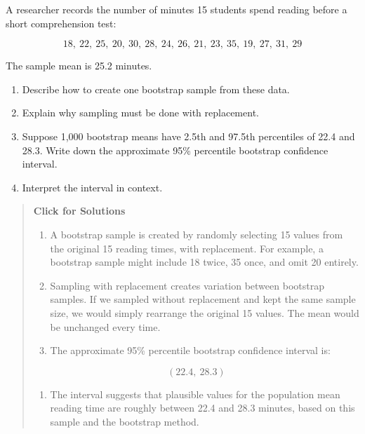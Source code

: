 \documentclass[
  letterpaper,
  DIV=11,
  numbers=noendperiod]{scrreprt}
\providecommand{\tightlist}{%
  \setlength{\itemsep}{0pt}\setlength{\parskip}{0pt}}
\begin{document}
\begin{tcolorbox}[enhanced jigsaw, arc=.35mm, bottomrule=.15mm, bottomtitle=1mm, breakable, colback=white, colbacktitle=quarto-callout-note-color!10!white, colframe=quarto-callout-note-color-frame, coltitle=black, left=2mm, leftrule=.75mm, opacityback=0, opacitybacktitle=0.6, rightrule=.15mm, title=\textcolor{quarto-callout-note-color}{\faInfo}\hspace{0.5em}{Question 2}, titlerule=0mm, toprule=.15mm, toptitle=1mm]

A researcher records the number of minutes 15 students spend reading
before a short comprehension test:

\[18,\ 22,\ 25,\ 20,\ 30,\ 28,\ 24,\ 26,\ 21,\ 23,\ 35,\ 19,\ 27,\ 31,\ 29\]

The sample mean is 25.2 minutes.

\begin{enumerate}
\def\labelenumi{(\alph{enumi})}
\item
  Describe how to create one bootstrap sample from these data.
\item
  Explain why sampling must be done with replacement.
\item
  Suppose 1,000 bootstrap means have 2.5th and 97.5th percentiles of
  22.4 and 28.3. Write down the approximate 95\% percentile bootstrap
  confidence interval.
\item
  Interpret the interval in context.
\end{enumerate}

\begin{quote}
\textbf{Click for Solutions}

\begin{enumerate}
\def\labelenumi{(\alph{enumi})}
\item
  A bootstrap sample is created by randomly selecting 15 values from the
  original 15 reading times, with replacement. For example, a bootstrap
  sample might include 18 twice, 35 once, and omit 20 entirely.
\item
  Sampling with replacement creates variation between bootstrap samples.
  If we sampled without replacement and kept the same sample size, we
  would simply rearrange the original 15 values. The mean would be
  unchanged every time.
\item
  The approximate 95\% percentile bootstrap confidence interval is:
\end{enumerate}

\[(22.4,\ 28.3)\]

\begin{enumerate}
\def\labelenumi{(\alph{enumi})}
\setcounter{enumi}{3}
\tightlist
\item
  The interval suggests that plausible values for the population mean
  reading time are roughly between 22.4 and 28.3 minutes, based on this
  sample and the bootstrap method.
\end{enumerate}
\end{quote}

\end{tcolorbox}
\end{document}
